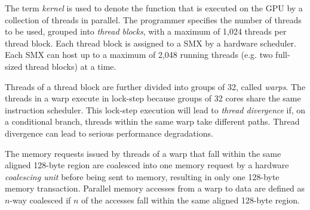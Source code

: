 
The term \emph{kernel} is used to denote the function that is executed on the 
GPU by a collection of threads in parallel.
The programmer specifies the number of threads to be used,
grouped into {\it thread blocks}, with a maximum
of 1,024 threads per thread block.
Each thread block is assigned to a SMX by a hardware scheduler. 
Each SMX can host up to a maximum of 2,048 running threads (e.g. two full-sized thread blocks) at a time.

Threads of a thread block are further divided into groups of 32, called \emph{warps}. 
The threads in a warp execute in lock-step 
because groups of 32 cores share the same instruction scheduler.
This lock-step execution will lead to {\it thread divergence} if,
on a conditional branch, threads within the same warp take different paths.
Thread divergence can lead to serious performance degradations. 

The memory requests issued by threads of a warp that fall within the same aligned 128-byte region are
coalesced into one memory request by a hardware \emph{coalescing unit} before being sent to memory, resulting in only one 128-byte memory transaction. 
Parallel memory accesses from a warp to data are defined as $n$-way coalesced if $n$ of the accesses fall
within the same aligned 128-byte region.




